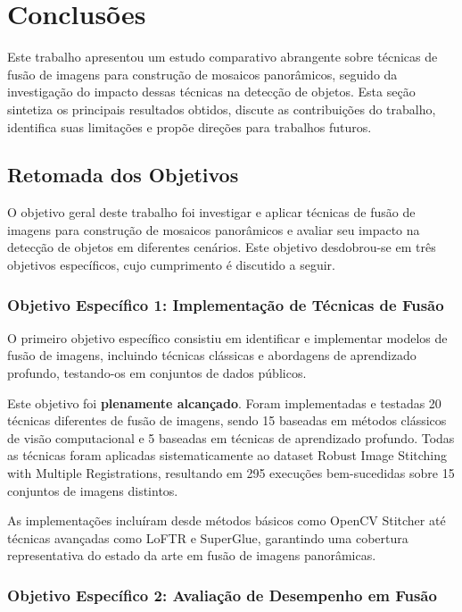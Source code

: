 \chapter{Conclusões}\label{cap:conclusoeseperspectivas}

Este trabalho apresentou um estudo comparativo abrangente sobre técnicas de fusão de imagens para construção de mosaicos panorâmicos, seguido da investigação do impacto dessas técnicas na detecção de objetos. Esta seção sintetiza os principais resultados obtidos, discute as contribuições do trabalho, identifica suas limitações e propõe direções para trabalhos futuros.

\section{Retomada dos Objetivos}

O objetivo geral deste trabalho foi investigar e aplicar técnicas de fusão de imagens para construção de mosaicos panorâmicos e avaliar seu impacto na detecção de objetos em diferentes cenários. Este objetivo desdobrou-se em três objetivos específicos, cujo cumprimento é discutido a seguir.

\subsection{Objetivo Específico 1: Implementação de Técnicas de Fusão}

O primeiro objetivo específico consistiu em identificar e implementar modelos de fusão de imagens, incluindo técnicas clássicas e abordagens de aprendizado profundo, testando-os em conjuntos de dados públicos.

Este objetivo foi \textbf{plenamente alcançado}. Foram implementadas e testadas 20 técnicas diferentes de fusão de imagens, sendo 15 baseadas em métodos clássicos de visão computacional e 5 baseadas em técnicas de aprendizado profundo. Todas as técnicas foram aplicadas sistematicamente ao dataset Robust Image Stitching with Multiple Registrations, resultando em 295 execuções bem-sucedidas sobre 15 conjuntos de imagens distintos.

As implementações incluíram desde métodos básicos como OpenCV Stitcher até técnicas avançadas como LoFTR e SuperGlue, garantindo uma cobertura representativa do estado da arte em fusão de imagens panorâmicas.

\subsection{Objetivo Específico 2: Avaliação de Desempenho em Fusão}

